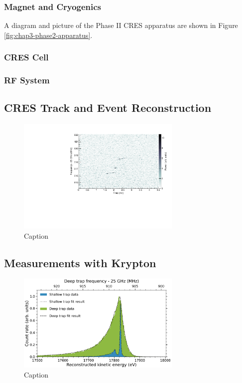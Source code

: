 \subsubsection*{Magnet and Cryogenics}
A diagram and picture of the Phase II CRES apparatus are shown in Figure \ref{fig:chap3-phase2-apparatus}. 

\subsubsection*{CRES Cell}

\subsubsection*{RF System}

\subsection{CRES Track and Event Reconstruction}

\begin{figure}[htbp]
    \centering
    \includegraphics[width=0.7\textwidth]{figs/Chapter-3/T2_Event0.pdf}
    \caption{Caption}
    \label{fig:tritium_event0}
\end{figure}

\subsection{Measurements with Krypton}

\begin{figure}[htbp]
    \centering
    \includegraphics[width=0.7\textwidth]{figs/Chapter-3/kr_fit.pdf}
    \caption{Caption}
    \label{fig:krypton_fit}
\end{figure}

